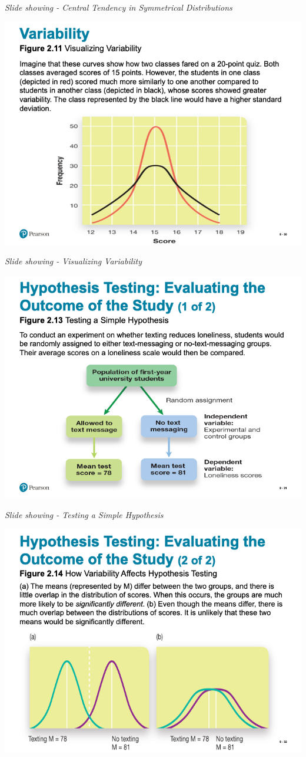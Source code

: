 \documentclass[
]{book}
\begin{document}
\emph{Slide showing - Central Tendency in Symmetrical Distributions}

\includegraphics{assets/unit_1/slide_30.png}

\emph{Slide showing - Visualizing Variability}

\includegraphics{assets/unit_1/slide_31.png}

\emph{Slide showing - Testing a Simple Hypothesis}

\includegraphics{assets/unit_1/slide_32.png}
\end{document}
